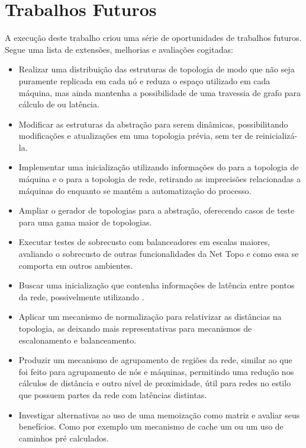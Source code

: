 
\section{Trabalhos Futuros}
\label{sec:futuro}

A execução deste trabalho criou uma série de oportunidades de trabalhos futuros. Segue uma lista de extensões, melhorias e avaliações cogitadas:
\begin{itemize}
    \item Realizar uma distribuição das estruturas de topologia de modo que não seja puramente replicada em cada nó e reduza o espaço utilizado em cada máquina, mas ainda mantenha a possibilidade de uma travessia de grafo para cálculo de \hops ou latência.
    \item Modificar as estruturas da abstração para serem dinâmicas, possibilitando modificações e atualizações em uma topologia prévia, sem ter de reinicializá-la.
    \item Implementar uma inicialização utilizando informações do \hwloc para a topologia de máquina e o \charm para a topologia de rede, retirando as imprecisões relacionadas a máquinas do \charm enquanto se mantém a automatização do processo.
    \item Ampliar o gerador de topologias para a abstração, oferecendo casos de teste para uma gama maior de topologias.
    \item Executar testes de sobrecusto com balanceadores em escalas maiores, avaliando o sobrecusto de outras funcionalidades da Net Topo e como essa se comporta em outros ambientes.
    \item Buscar uma inicialização que contenha informações de latência entre pontos da rede, possivelmente utilizando \netloc.
    \item Aplicar um mecanismo de normalização para relativizar as distâncias na topologia, as deixando mais representativas para mecanismos de escalonamento e balanceamento.
    \item Produzir um mecanismo de agrupamento de regiões da rede, similar ao que foi feito para agrupamento de nós e máquinas, permitindo uma redução nos cálculos de distância e outro nível de proximidade, útil para redes no estilo \Dgfly que possuem partes da rede com latências distintas.
    \item Investigar alternativas ao uso de uma memoização como matriz e avaliar seus benefícios. Como por exemplo um mecanismo de cache um ou um uso de caminhos pré calculados.
\end{itemize}



